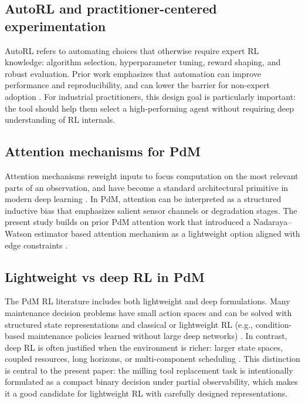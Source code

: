 \documentclass[11pt]{article}
\begin{document}
\subsection{AutoRL and practitioner-centered experimentation}
AutoRL refers to automating choices that otherwise require expert RL knowledge: algorithm selection, hyperparameter tuning, reward shaping, and robust evaluation. Prior work emphasizes that automation can improve performance and reproducibility, and can lower the barrier for non-expert adoption \parencite{Faust2019EvolvingRewards, Mussi2023ARLO}. For industrial practitioners, this design goal is particularly important: the tool should help them select a high-performing agent without requiring deep understanding of RL internals.

\subsection{Attention mechanisms for PdM}
Attention mechanisms reweight inputs to focus computation on the most relevant parts of an observation, and have become a standard architectural primitive in modern deep learning \parencite{Vaswani2017Attention}. In PdM, attention can be interpreted as a structured inductive bias that emphasizes salient sensor channels or degradation stages. The present study builds on prior PdM attention work that introduced a Nadaraya--Watson estimator based attention mechanism as a lightweight option aligned with edge constraints \parencite{Siraskar2024NWAttention}.

\subsection{Lightweight vs deep RL in PdM}
The PdM RL literature includes both lightweight and deep formulations. Many maintenance decision problems have small action spaces and can be solved with structured state representations and classical or lightweight RL (e.g., condition-based maintenance policies learned without large deep networks) \parencite{Adsule2020CBMRL, Yousefi2020QualityEngineering}. In contrast, deep RL is often justified when the environment is richer: larger state spaces, coupled resources, long horizons, or multi-component scheduling \parencite{Liu2020EJOR, LeeMitici2022RESS, Chen2023IISE, Ong2022TransferDRL}. This distinction is central to the present paper: the milling tool replacement task is intentionally formulated as a compact binary decision under partial observability, which makes it a good candidate for lightweight RL with carefully designed representations.
\end{document}
